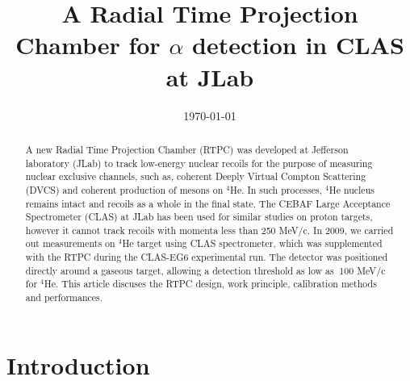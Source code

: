 \documentclass[twocolumn,showpacs,superscriptaddress,groupedaddress]{revtex4}
\begin{document}

\title{\vspace{-15mm}\fontsize{24pt}{10pt}\selectfont\textbf{A Radial Time 
Projection Chamber for $\alpha$ detection in CLAS at JLab}}
  

\date{\today}

\begin{abstract}
A new Radial Time Projection Chamber (RTPC) was developed at Jefferson 
laboratory (JLab) to track low-energy nuclear recoils for the purpose of 
measuring nuclear exclusive channels, such as, coherent Deeply Virtual Compton 
Scattering (DVCS) and coherent production of mesons on $^4$He. In such 
processes, $^4$He nucleus remains intact and recoils as a whole in the final 
state. The CEBAF Large Acceptance Spectrometer (CLAS) at JLab has been used for 
similar studies on proton targets, however it cannot track recoils with momenta 
less than 250 MeV/c. In 2009, we carried out measurements on $^4$He target 
using CLAS spectrometer, which was supplemented with the RTPC during the 
CLAS-EG6 experimental run. The detector was positioned directly around a 
gaseous target, allowing a detection threshold as low as $~$100  MeV/c for 
$^4$He. This article discuses the RTPC design, work principle, calibration 
methods and performances.
\end{abstract}

\maketitle


\section{Introduction} \label{sec:level1}
\end{document}
